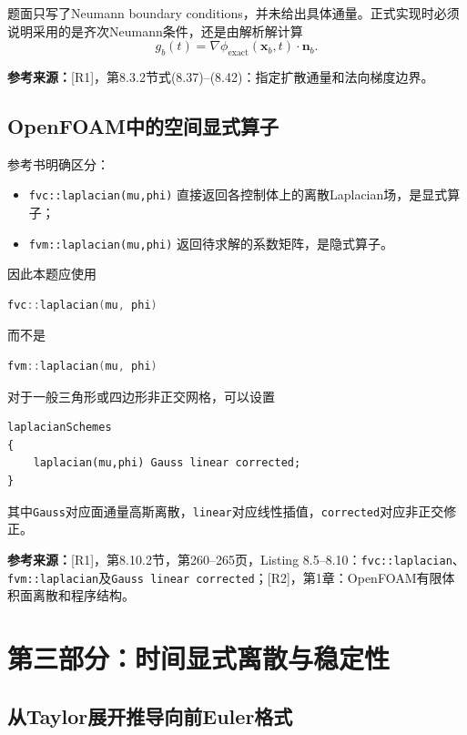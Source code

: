 \documentclass[UTF8,12pt,a4paper]{ctexart}
\numberwithin{equation}{section}
\newcommand{\Rone}{\textnormal{[R1]}}
\newcommand{\Rtwo}{\textnormal{[R2]}}
\newcommand{\source}[1]{%
  \par\smallskip
  \noindent\colorbox{sourcebg}{%
    \parbox{0.955\linewidth}{\raggedright\footnotesize\color{sourcegray}\textbf{参考来源：}#1}%
  }
  \par\smallskip
}
\newcommand{\xf}{\bm x}
\begin{document}
题面只写了Neumann boundary conditions，并未给出具体通量。正式实现时必须说明采用的是齐次Neumann条件，还是由解析解计算
\begin{equation}
  g_b(t)=\nabla\phi_{\mathrm{exact}}(\xf_b,t)\cdot\bm n_b.
  \label{eq:exact_neumann}
\end{equation}

\source{\Rone，第8.3.2节式(8.37)--(8.42)：指定扩散通量和法向梯度边界。}

\subsection{OpenFOAM中的空间显式算子}

参考书明确区分：
\begin{itemize}
  \item \texttt{fvc::laplacian(mu,phi)} 直接返回各控制体上的离散Laplacian场，是显式算子；
  \item \texttt{fvm::laplacian(mu,phi)} 返回待求解的系数矩阵，是隐式算子。
\end{itemize}
因此本题应使用
\begin{lstlisting}[style=solver,language=C++]
fvc::laplacian(mu, phi)
\end{lstlisting}
而不是
\begin{lstlisting}[style=solver,language=C++]
fvm::laplacian(mu, phi)
\end{lstlisting}
对于一般三角形或四边形非正交网格，可以设置
\begin{lstlisting}[style=solver]
laplacianSchemes
{
    laplacian(mu,phi) Gauss linear corrected;
}
\end{lstlisting}
其中\texttt{Gauss}对应面通量高斯离散，\texttt{linear}对应线性插值，\texttt{corrected}对应非正交修正。

\source{\Rone，第8.10.2节，第260--265页，Listing 8.5--8.10：\texttt{fvc::laplacian}、\texttt{fvm::laplacian}及\texttt{Gauss linear corrected}；\Rtwo，第1章：OpenFOAM有限体积面离散和程序结构。}

\newpage
\section{第三部分：时间显式离散与稳定性}

\subsection{从Taylor展开推导向前Euler格式}
\end{document}
